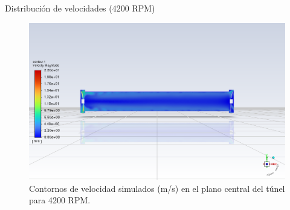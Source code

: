 \begin{frame}{Distribución de velocidades (4200 RPM)}
    \begin{block}{}
        \begin{figure}[ht!]
            \centering
            \includegraphics[width=0.6\linewidth]{dump/vel3.png}
            \caption{Contornos de velocidad simulados (m/s) en el plano central del túnel para 4200 RPM.}
        \end{figure}
    \end{block}
\end{frame}

